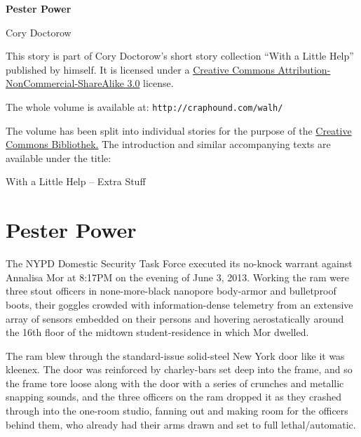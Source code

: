

\newlength{\edialogindent}
\settowidth{\edialogindent}{\textgreater\ }
\newcommand\edialog[1]{
{
  \setlength\parindent{0pt}
  \setlength\hangindent{\edialogindent}
  \raggedright
  \textgreater\ \texttt{#1}
  \par
}}


\raggedbottom

\begin{center}
\textbf{\huge\textsf{Pester Power}}

\medskip
Cory Doctorow

\end{center}

\bigskip

\begin{flushleft}
This story is part of Cory Doctorow’s short story collection
“With a Little Help” published by himself. It is licensed under a
\href{http://creativecommons.org/licenses/by-nc-sa/}
{Creative Commons Attribution-NonCommercial-ShareAlike 3.0} license.

\bigskip

The whole volume is available at:
\texttt{http://craphound.com/walh/}

\medskip

The volume has been split into individual stories for the purpose of the
\href{http://ccbib.org}{Creative Commons Bibliothek.}
The introduction and similar accompanying texts are available under the 
title:
\end{flushleft}
\begin{center}
With a Little Help -- Extra Stuff
\end{center}

\newpage

\section{Pester Power}

The NYPD Domestic Security Task Force executed its no-knock warrant 
against Annalisa Mor at 8:17PM on the evening of June 3, 2013. Working 
the ram were three stout officers in none-more-black nanopore 
body-armor and bulletproof boots, their goggles crowded with 
information-dense telemetry from an extensive array of sensors embedded 
on their persons and hovering aerostatically around the 16th floor of 
the midtown student-residence in which Mor dwelled.

The ram blew through the standard-issue solid-steel New York door like 
it was kleenex. The door was reinforced by charley-bars set deep into 
the frame, and so the frame tore loose along with the door with a 
series of crunches and metallic snapping sounds, and the three officers 
on the ram dropped it as they crashed through into the one-room studio, 
fanning out and making room for the officers behind them, who already 
had their arms drawn and set to full lethal/automatic.

